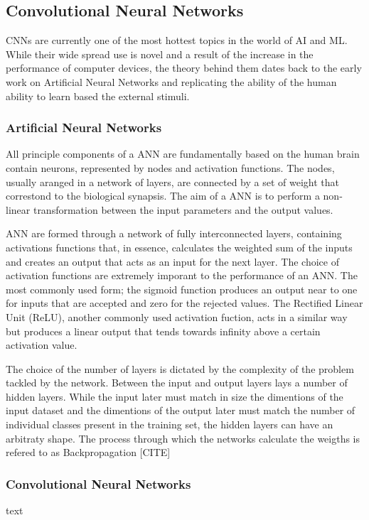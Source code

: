 \subsection{Convolutional Neural Networks} \label{sec:CNN}
CNNs are currently one of the most hottest topics in the world of AI and ML. While their wide spread use is novel and a result of the increase in the performance of computer devices, the theory behind them dates back to the early work on Artificial Neural Networks \citep[ANN;][]{Mcculloch1943} and replicating the ability of the human ability to learn based the external stimuli.

\subsubsection{Artificial Neural Networks}
All principle components of a ANN are fundamentally based on the human brain contain neurons, represented by nodes and activation functions. The nodes, usually aranged in a network of layers, are connected by a set of weight that correstond to the biological synapsis. The aim of a ANN is to perform a non-linear transformation between the input parameters and the output values.

ANN are formed through a network of fully interconnected layers, containing activations functions that, in essence, calculates the weighted sum of the inputs and creates an output that acts as an input for the next layer. The choice of activation functions are extremely imporant to the performance of an ANN. The most commonly used form; the sigmoid function produces an output near to one for inputs that are accepted and zero for the rejected values. The Rectified Linear Unit (ReLU), another commonly used activation fuction, acts in a similar way but produces a linear output that tends towards infinity above a certain activation value.

The choice of the number of layers is dictated by the complexity of the problem tackled by the network. Between the input and output layers lays a number of hidden layers. While the input later must match in size the dimentions of the input dataset and the dimentions of the output later must match the number of individual classes present in the training set, the hidden layers can have an arbitraty shape. The process through which the networks calculate the weigths is refered to as Backpropagation [CITE]  

\subsubsection{Convolutional Neural Networks}
text

